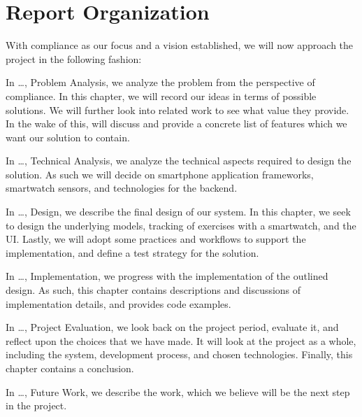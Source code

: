 \section{Report Organization}
With compliance as our focus and a vision established, we will now approach the project in the following fashion:

In \ldots, Problem Analysis, we analyze the problem from the perspective of compliance. In this chapter, we will record our ideas in terms of possible solutions. We will further look into related work to see what value they provide. In the wake of this, will discuss and provide a concrete list of features which we want our solution to contain. 

In \ldots, Technical Analysis, we analyze the technical aspects required to design the solution. As such we will decide on smartphone application frameworks, smartwatch sensors, and technologies for the backend.

In \ldots, Design, we describe the final design of our system. In this chapter, we seek to design the underlying models, tracking of exercises with a smartwatch, and the UI. Lastly, we will adopt some practices and workflows to support the implementation, and define a test strategy for the solution.

In \ldots, Implementation, we progress with the implementation of the outlined design. As such, this chapter contains descriptions and discussions of implementation details, and provides code examples.

In \ldots, Project Evaluation, we look back on the project period, evaluate it, and reflect upon the choices that we have made. It will look at the project as a whole, including the system, development process, and chosen technologies. Finally, this chapter contains a conclusion.

In \ldots, Future Work, we describe the work, which we believe will be the next step in the project.
